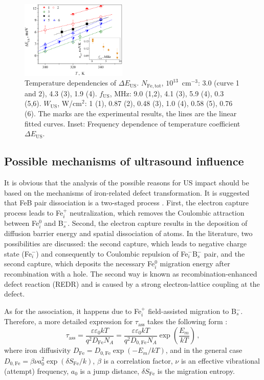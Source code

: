 \documentclass[%
 aip,jap,
 amsmath,amssymb,
 reprint,%
]{revtex4-1}
\begin{document}
\begin{figure}
\includegraphics[width=0.45\textwidth]{Fig7}%
\caption{\label{Fig:EmT}
Temperature dependencies of $\Delta E_\mathrm{US}$.
$N_\mathrm{Fe,tot}$, $10^{13}$~cm$^{-3}$:
3.0 (curve 1 and 2), 4.3 (3), 1.9 (4).
$f_\mathrm{US}$, MHz: 9.0 (1,2), 4.1 (3), 5.9 (4), 0.3 (5,6).
$W_\mathrm{US}$, W/cm$^2$: 1 (1), 0.87 (2), 0.48 (3), 1.0 (4), 0.58 (5), 0.76 (6).
The marks are the experimental results, the lines are the linear fitted curves.
Inset: Frequency dependence of temperature coefficient $\Delta E_\mathrm{US}$.
}
\end{figure}

\subsection{\label{sec:Meh} Possible mechanisms of ultrasound influence}

It is obvious that the analysis of the possible reasons for US impact should be based on the mechanisms of iron-related defect transformation.
It is suggested that FeB pair dissociation is a two-staged process \cite{FeBAssJAP2014,FeBLight2,KIMERLINGFeB}.
First, the electron capture process leads to Fe$_i^+$ neutralization, which removes the Coulombic attraction between Fe$_i^0$ and B$_s^-$.
Second, the electron capture results in the deposition of diffusion barrier energy and spatial dissociation of atoms.
In the literature, two possibilities are discussed:
the second capture, which leads to negative charge state (Fe$_i^-$) and consequently to Coulombic repulsion of Fe$_i^-$B$_s^-$ pair,
and the second capture, which deposits the necessary Fe$_i^0$ migration energy
after recombination with a hole.
The second way is known\cite{FeBAssJAP2014} as recombination-enhanced defect reaction (REDR) and is caused by a strong electron-lattice coupling at the defect.

As for the association, it happens due to Fe$_i^+$ field-assisted migration to B$_s^-$.
Therefore, a more detailed expression for $\tau_\mathrm{ass}$ takes
the following form \cite{FeBAssJAP2014,FeBJAP2005,FeBKin2019}:
\begin{equation}
\label{eqTass2}
\tau_\mathrm{ass}=\frac{\varepsilon\varepsilon_0 kT}{q^2D_\mathrm{Fe}N_A}=
\frac{\varepsilon\varepsilon_0 kT}{q^2D_\mathrm{0,Fe}N_A}\exp\left(\frac{E_m}{kT}\right)\,,
\end{equation}
where
iron diffusivity
$D_\mathrm{Fe}=D_\mathrm{0,Fe}\exp(-E_m/kT)$,
and in the general case\cite{AZIZ2001,Stavola,WeberFe}
$D_\mathrm{0,Fe}=\beta\nu a_0^2\exp(\delta S_\mathrm{Fe}/k)$,
$\beta$ is a correlation factor,
$\nu$  is an effective vibrational (attempt) frequency,
$a_0$ is a jump distance,
$\delta S_\mathrm{Fe}$ is the migration entropy.
\end{document}
